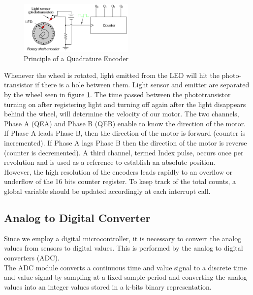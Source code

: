 \begin{figure}[H]
    \centering
    \includegraphics[width=0.5\textwidth]{figures/software/qei_demo.png}
    \caption{Principle of a Quadrature Encoder \cite{alex}}
    \label{fig:qei_demo}
\end{figure}
\vskip 0.2in
\noindent
Whenever the wheel is rotated, light emitted from the LED will hit the photo-transistor if there is a hole between them. Light sensor and emitter are separated by the wheel seen in figure \ref{fig:qei_demo}. The time passed between the phototransistor turning on after registering light and turning off again after the light disappears behind the wheel, will determine the velocity of our motor.
\vskip 0.2in
\noindent
The two channels, Phase A (QEA) and Phase B (QEB) enable to know the direction of the motor. If Phase A leads Phase B, then the direction of the motor is forward (counter is incremented). If Phase A lags Phase B then the direction of the motor is reverse (counter is decremented). A third channel, termed Index pulse, occurs once per revolution and is used as a reference to establish an absolute position.\\
However, the high resolution of the encoders leads rapidly to an overflow or underflow of the 16 bits counter register. To keep track of the total counts, a global variable should be updated accordingly at each interrupt call.

\subsection{Analog to Digital Converter}

Since we employ a digital microcontroller, it is necessary to convert the analog values from sensors to digital values. This is performed by the analog to digital converters (ADC).\\
The ADC module converts a continuous time and value signal to a discrete time and value signal by sampling at a fixed sample period and converting the analog values into an integer values stored in a k-bits binary representation.

